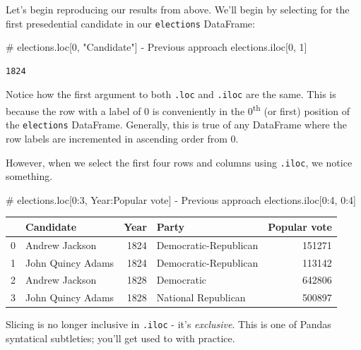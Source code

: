 \documentclass[
  letterpaper,
  DIV=11,
  numbers=noendperiod]{scrreprt}
\newenvironment{Shaded}{\begin{snugshade}}{\end{snugshade}}
\newcommand{\CommentTok}[1]{\textcolor[rgb]{0.37,0.37,0.37}{#1}}
\newcommand{\DecValTok}[1]{\textcolor[rgb]{0.68,0.00,0.00}{#1}}
\newcommand{\NormalTok}[1]{\textcolor[rgb]{0.00,0.23,0.31}{#1}}
\begin{document}
Let's begin reproducing our results from above. We'll begin by selecting
for the first presedential candidate in our \texttt{elections}
DataFrame:

\begin{Shaded}
\begin{Highlighting}[]
\CommentTok{\# elections.loc[0, "Candidate"] {-} Previous approach}
\NormalTok{elections.iloc[}\DecValTok{0}\NormalTok{, }\DecValTok{1}\NormalTok{]}
\end{Highlighting}
\end{Shaded}

\begin{verbatim}
1824
\end{verbatim}

Notice how the first argument to both \texttt{.loc} and \texttt{.iloc}
are the same. This is because the row with a label of 0 is conveniently
in the 0\textsuperscript{th} (or first) position of the
\texttt{elections} DataFrame. Generally, this is true of any DataFrame
where the row labels are incremented in ascending order from 0.

However, when we select the first four rows and columns using
\texttt{.iloc}, we notice something.

\begin{Shaded}
\begin{Highlighting}[]
\CommentTok{\# elections.loc[0:3, \textquotesingle{}Year\textquotesingle{}:\textquotesingle{}Popular vote\textquotesingle{}] {-} Previous approach}
\NormalTok{elections.iloc[}\DecValTok{0}\NormalTok{:}\DecValTok{4}\NormalTok{, }\DecValTok{0}\NormalTok{:}\DecValTok{4}\NormalTok{]}
\end{Highlighting}
\end{Shaded}

\begin{tabular}{llrlr}
\toprule
{} &          Candidate &  Year &                  Party &  Popular vote \\
\midrule
0 &     Andrew Jackson &  1824 &  Democratic-Republican &        151271 \\
1 &  John Quincy Adams &  1824 &  Democratic-Republican &        113142 \\
2 &     Andrew Jackson &  1828 &             Democratic &        642806 \\
3 &  John Quincy Adams &  1828 &    National Republican &        500897 \\
\bottomrule
\end{tabular}

Slicing is no longer inclusive in \texttt{.iloc} - it's
\emph{exclusive}. This is one of Pandas syntatical subtleties; you'll
get used to with practice.
\end{document}
